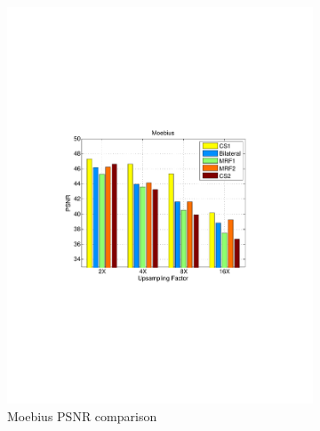 \documentclass[preprint,10pt,5p,times,twocolumn]{elsarticle}
\begin{document}
\begin{figure}
\begin{subfigure}[b]{0.24\textwidth}
\includegraphics[width=\textwidth]{fig_exp1_moebius.pdf}
\caption*{Moebius PSNR comparison}
\end{subfigure}
\begin{subfigure}[b]{0.24\textwidth}

\end{subfigure}
\end{figure}
\end{document}
